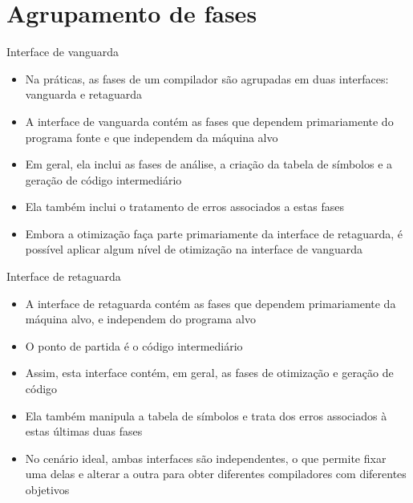 \section{Agrupamento de fases}

\begin{frame}[fragile]{Interface de vanguarda}

    \begin{itemize}
        \item Na práticas, as fases de um compilador são agrupadas em duas interfaces: vanguarda e retaguarda
        \pause

        \item A interface de vanguarda contém as fases que dependem primariamente do programa fonte e que independem da máquina alvo
        \pause

        \item Em geral, ela inclui as fases de análise, a criação da tabela de símbolos e a geração de código intermediário
        \pause

        \item Ela também inclui o tratamento de erros associados a estas fases
        \pause

        \item Embora a otimização faça parte primariamente da interface de retaguarda, é possível aplicar algum nível de otimização na interface de
        vanguarda
    \end{itemize}

\end{frame}

\begin{frame}[fragile]{Interface de retaguarda}

    \begin{itemize}
        \item A interface de retaguarda contém as fases que dependem primariamente da máquina alvo, e independem do programa alvo
        \pause

        \item O ponto de partida é o código intermediário
        \pause

        \item Assim, esta interface contém, em geral, as fases de otimização e geração de código
        \pause

        \item Ela também manipula a tabela de símbolos e trata dos erros associados à estas últimas duas fases
        \pause

        \item No cenário ideal, ambas interfaces são independentes, o que permite fixar uma delas e alterar a outra para obter diferentes compiladores com
        diferentes objetivos
    \end{itemize}

\end{frame}

